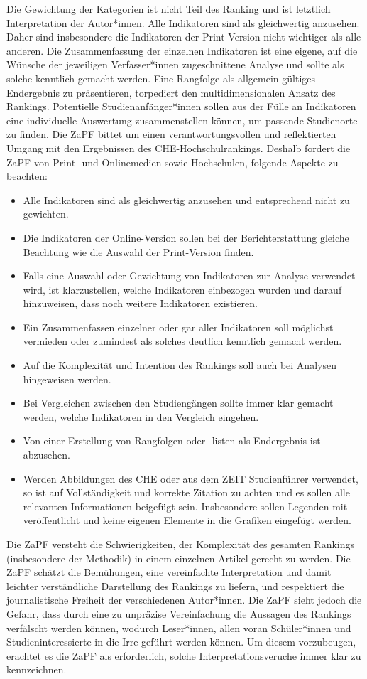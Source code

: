 Die Gewichtung der Kategorien ist nicht Teil des Ranking und ist letztlich Interpretation der Autor*innen. Alle Indikatoren sind als gleichwertig anzusehen. Daher sind insbesondere die Indikatoren der Print-Version nicht wichtiger als alle anderen.
Die Zusammenfassung der einzelnen Indikatoren ist eine eigene, auf die Wünsche der jeweiligen Verfasser*innen zugeschnittene Analyse und sollte als solche kenntlich gemacht werden.
Eine Rangfolge als allgemein gültiges Endergebnis zu präsentieren, torpediert den multidimensionalen Ansatz des Rankings. Potentielle Studienanfänger*innen sollen aus der Fülle an Indikatoren eine individuelle Auswertung zusammenstellen können, um passende Studienorte zu finden.
Die ZaPF bittet um einen verantwortungsvollen und reflektierten Umgang mit den Ergebnissen des CHE-Hochschulrankings.
Deshalb fordert die ZaPF von Print- und Onlinemedien sowie Hochschulen, folgende Aspekte zu beachten:
\begin{itemize}
\item Alle Indikatoren sind als gleichwertig anzusehen und entsprechend nicht zu gewichten.
\item Die Indikatoren der Online-Version sollen bei der Berichterstattung gleiche Beachtung wie die Auswahl der Print-Version finden.
\item  Falls eine Auswahl oder Gewichtung von Indikatoren zur Analyse verwendet wird, ist klarzustellen, welche Indikatoren einbezogen wurden und darauf hinzuweisen, dass noch weitere Indikatoren existieren.
\item Ein Zusammenfassen einzelner oder gar aller Indikatoren soll möglichst vermieden oder zumindest als solches deutlich kenntlich gemacht werden.
\item Auf die Komplexität und Intention des Rankings soll auch bei Analysen hingeweisen werden.
\item Bei Vergleichen zwischen den Studiengängen sollte immer klar gemacht werden, welche Indikatoren in den Vergleich eingehen.
\item Von einer Erstellung von Rangfolgen oder -listen als Endergebnis ist abzusehen.
\item Werden Abbildungen des CHE oder aus dem ZEIT Studienführer verwendet, so ist auf Vollständigkeit und korrekte Zitation zu achten und es sollen alle relevanten Informationen beigefügt sein. Insbesondere sollen Legenden mit veröffentlicht und keine eigenen Elemente in die Grafiken eingefügt werden.
\end{itemize}

Die ZaPF versteht die Schwierigkeiten, der Komplexität des gesamten Rankings (insbesondere der Methodik) in einem einzelnen Artikel gerecht zu werden. Die ZaPF schätzt die Bemühungen, eine vereinfachte Interpretation und damit leichter verständliche Darstellung des Rankings zu liefern, und respektiert die journalistische Freiheit der verschiedenen Autor*innen.
Die ZaPF sieht jedoch die Gefahr, dass durch eine zu unpräzise Vereinfachung die Aussagen des Rankings verfälscht werden können, wodurch Leser*innen, allen voran Schüler*innen und Studieninteressierte in die Irre geführt werden können.
Um diesem vorzubeugen, erachtet es die ZaPF als erforderlich, solche Interpretationsveruche immer klar zu kennzeichnen.
